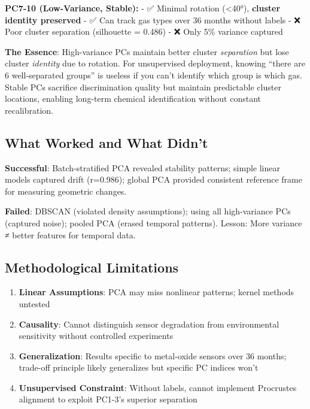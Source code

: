 \documentclass[
  letterpaper,
  DIV=11,
  numbers=noendperiod]{scrartcl}
\providecommand{\tightlist}{%
  \setlength{\itemsep}{0pt}\setlength{\parskip}{0pt}}
\begin{document}
\textbf{PC7-10 (Low-Variance, Stable):} - ✅ Minimal rotation
(\textless40°), \textbf{cluster identity preserved} - ✅ Can track gas
types over 36 months without labels - ❌ Poor cluster separation
(silhouette = 0.486) - ❌ Only 5\% variance captured

\textbf{The Essence}: High-variance PCs maintain better cluster
\emph{separation} but lose cluster \emph{identity} due to rotation. For
unsupervised deployment, knowing ``there are 6 well-separated groups''
is useless if you can't identify which group is which gas. Stable PCs
sacrifice discrimination quality but maintain predictable cluster
locations, enabling long-term chemical identification without constant
recalibration.

\subsection{What Worked and What
Didn't}\label{what-worked-and-what-didnt}

\textbf{Successful}: Batch-stratified PCA revealed stability patterns;
simple linear models captured drift (r=0.986); global PCA provided
consistent reference frame for measuring geometric changes.

\textbf{Failed}: DBSCAN (violated density assumptions); using all
high-variance PCs (captured noise); pooled PCA (erased temporal
patterns). Lesson: More variance ≠ better features for temporal data.

\subsection{Methodological
Limitations}\label{methodological-limitations}

\begin{enumerate}
\def\labelenumi{\arabic{enumi}.}
\tightlist
\item
  \textbf{Linear Assumptions}: PCA may miss nonlinear patterns; kernel
  methods untested
\item
  \textbf{Causality}: Cannot distinguish sensor degradation from
  environmental sensitivity without controlled experiments
\item
  \textbf{Generalization}: Results specific to metal-oxide sensors over
  36 months; trade-off principle likely generalizes but specific PC
  indices won't
\item
  \textbf{Unsupervised Constraint}: Without labels, cannot implement
  Procrustes alignment to exploit PC1-3's superior separation
\end{enumerate}
\end{document}
